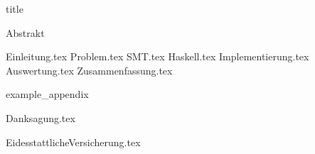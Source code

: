 \documentclass[12pt]{scrreport}
\begin{document}
    {title}

    \frontmatter

    {Abstrakt}
    \newpage

    \tableofcontents


    \mainmatter

    {Einleitung.tex}
    {Problem.tex}
    {SMT.tex}
    {Haskell.tex}
    {Implementierung.tex}
    {Auswertung.tex}
    {Zusammenfassung.tex}

    \newpage
    \printbibliography[heading = bibintoc, title = Literatur]    %

    \addappendix
    {example_appendix}
    \newpage


    \clearpage
    {Danksagung.tex}
    \newpage

    \clearpage
    {EidesstattlicheVersicherung.tex}


\end{document}
